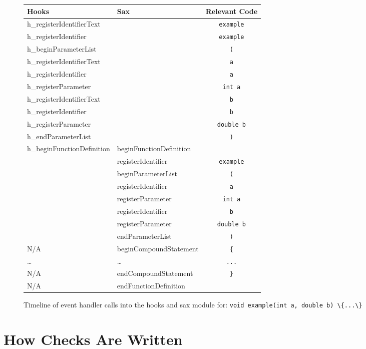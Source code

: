 \documentclass[12pt]{report}
\begin{document}
\begin{figure}
\begin{center}
\begin{tabular}{llc}
\toprule
Hooks & Sax  & Relevant Code\\
\midrule
h\_registerIdentifierText & & \lstinline!example! \\
h\_registerIdentifier & & \lstinline!example! \\
h\_beginParameterList & & \lstinline!(! \\
h\_registerIdentifierText & & \lstinline!a! \\
h\_registerIdentifier & & \lstinline!a! \\
h\_registerParameter & & \lstinline!int a! \\
h\_registerIdentifierText & & \lstinline!b! \\
h\_registerIdentifier & & \lstinline!b! \\
h\_registerParameter & & \lstinline!double b! \\
h\_endParameterList & & \lstinline!)! \\
h\_beginFunctionDefinition & beginFunctionDefinition & \\
 & registerIdentifier & \lstinline!example! \\
 & beginParameterList & \lstinline!(! \\
 & registerIdentifier & \lstinline!a! \\
 & registerParameter & \lstinline!int a! \\
 & registerIdentifier & \lstinline!b!\\
 & registerParameter & \lstinline!double b!\\
 & endParameterList & \lstinline!)!\\
N/A & beginCompoundStatement & \lstinline!{!\\
\ldots & \ldots & \lstinline!...! \\
N/A & endCompoundStatement & \lstinline!}!\\
N/A & endFunctionDefinition \\
 \bottomrule
\end{tabular}
\end{center}
\caption[Timeline of Event Handler Calls]{Timeline of event handler calls into the hooks and sax module for: \lstinline!void example(int a, double b) \{...\}!}
\label{handlerTimeline}
\end{figure}
\newpage

\section{How Checks Are Written}
\label{howChecksAreWritten}
\end{document}
